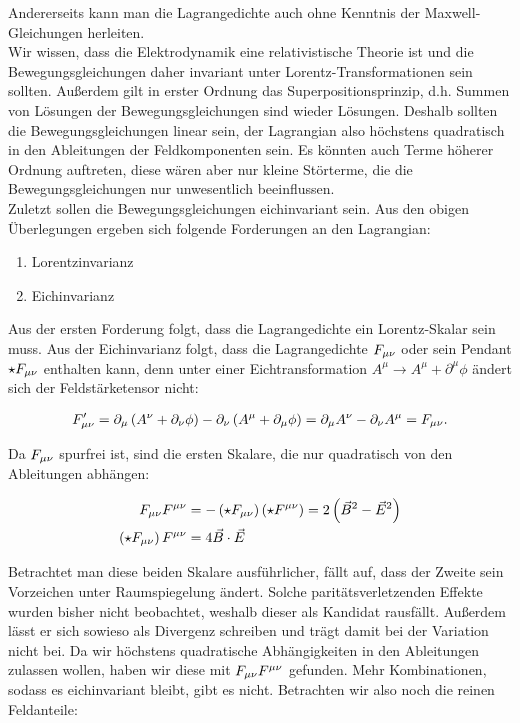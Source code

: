 Andererseits kann man die Lagrangedichte auch ohne Kenntnis der Maxwell-Gleichungen herleiten. \\
Wir wissen, dass die Elektrodynamik eine relativistische Theorie ist und die Bewegungsgleichungen daher invariant unter Lorentz-Transformationen sein sollten. Außerdem gilt in erster Ordnung das Superpositionsprinzip, d.h. Summen von Lösungen der Bewegungsgleichungen sind wieder Lösungen. Deshalb sollten die Bewegungsgleichungen linear sein, der Lagrangian also höchstens quadratisch in den Ableitungen der Feldkomponenten sein. Es könnten auch Terme höherer Ordnung auftreten, diese wären aber nur kleine Störterme, die die Bewegungsgleichungen nur unwesentlich beeinflussen. \\ 
Zuletzt sollen die Bewegungsgleichungen eichinvariant sein.
Aus den obigen Überlegungen ergeben sich folgende Forderungen an den Lagrangian: \\
\begin{enumerate}
	\item Lorentzinvarianz
	\item Eichinvarianz 
\end{enumerate}

Aus der ersten Forderung folgt, dass die Lagrangedichte ein Lorentz-Skalar sein muss. Aus der Eichinvarianz folgt, dass die Lagrangedichte $F_{\mu \nu}$ oder sein Pendant $\star F_{\mu \nu}$ enthalten kann, denn unter einer Eichtransformation $A^{\mu} \rightarrow A^{\mu} + \partial^{\mu} \phi$ ändert sich der Feldstärketensor nicht:

\begin{align}
F_{\mu \nu} ' = \partial_{\mu} \left( A^{\nu} + \partial_{\nu} \phi \right) - \partial_{\nu} \left( A^{\mu} + \partial_{\mu} \phi \right) = \partial_{\mu}  A^{\nu} - \partial_{\nu} A^{\mu} = F_{\mu \nu}.
\end{align}

Da $F_{\mu \nu}$ spurfrei ist, sind die ersten Skalare, die nur quadratisch von den Ableitungen abhängen:

\begin{align}
F_{\mu \nu} F^{\mu \nu} &= - \left( \star F_{\mu \nu} \right) \left( \star F^{\mu \nu} \right) = 2 \left( \vec{B}^2 - \vec{E}^2 \right) \\
\left( \star F_{\mu \nu} \right) F^{\mu \nu} &= 4 \vec{B} \cdot \vec{E}
\end{align}

Betrachtet man diese beiden Skalare ausführlicher, fällt auf, dass der Zweite sein Vorzeichen unter Raumspiegelung ändert. Solche paritätsverletzenden Effekte wurden bisher nicht beobachtet, weshalb dieser als Kandidat rausfällt. Außerdem lässt er sich sowieso als Divergenz schreiben und trägt damit bei der Variation nicht bei. Da wir höchstens quadratische Abhängigkeiten in den Ableitungen zulassen wollen, haben wir diese mit $F_{\mu \nu} F^{\mu \nu}$ gefunden. Mehr Kombinationen, sodass es eichinvariant bleibt, gibt es nicht. Betrachten wir also noch die reinen Feldanteile: \\

